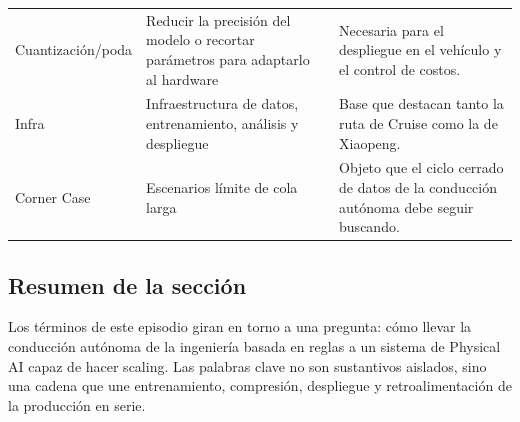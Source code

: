 \begin{longtable}{p{}p{}p{}}
Cuantización/poda & Reducir la precisión del modelo o recortar parámetros para adaptarlo al hardware & Necesaria para el despliegue en el vehículo y el control de costos. \\
Infra & Infraestructura de datos, entrenamiento, análisis y despliegue & Base que destacan tanto la ruta de Cruise como la de Xiaopeng. \\
Corner Case & Escenarios límite de cola larga & Objeto que el ciclo cerrado de datos de la conducción autónoma debe seguir buscando. \\
\bottomrule
\end{longtable}

\subsection{Resumen de la sección}

Los términos de este episodio giran en torno a una pregunta: cómo llevar la conducción autónoma de la ingeniería basada en reglas a un sistema de Physical AI capaz de hacer scaling. Las palabras clave no son sustantivos aislados, sino una cadena que une entrenamiento, compresión, despliegue y retroalimentación de la producción en serie.
